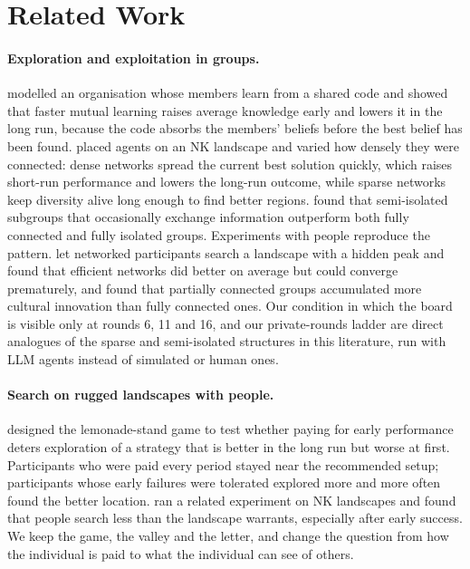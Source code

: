 \section{Related Work}\label{sec:related}

\paragraph{Exploration and exploitation in groups.}
\citet{march1991exploration} modelled an organisation whose members learn from a shared code and showed that
faster mutual learning raises average knowledge early and lowers it in the long run, because the code absorbs
the members' beliefs before the best belief has been found. \citet{lazer2007network} placed agents on an NK
landscape \citep{levinthal1997adaptation} and varied how densely they were connected: dense networks spread the
current best solution quickly, which raises short-run performance and lowers the long-run outcome, while
sparse networks keep diversity alive long enough to find better regions. \citet{fang2010balancing} found that
semi-isolated subgroups that occasionally exchange information outperform both fully connected and fully
isolated groups. Experiments with people reproduce the pattern. \citet{mason2012collaborative} let networked
participants search a landscape with a hidden peak and found that efficient networks did better on average
but could converge prematurely, and \citet{derex2016partial} found that partially connected groups accumulated
more cultural innovation than fully connected ones. Our condition in which the board is visible only at rounds 6, 11 and 16, and our private-rounds
ladder are direct analogues of the sparse and semi-isolated structures in this literature, run with LLM agents
instead of simulated or human ones.

\paragraph{Search on rugged landscapes with people.}
\citet{ederer2013pay} designed the lemonade-stand game to test whether paying for early performance deters
exploration of a strategy that is better in the long run but worse at first. Participants who were paid every
period stayed near the recommended setup; participants whose early failures were tolerated explored more and
more often found the better location. \citet{billinger2014search} ran a related experiment on NK landscapes
and found that people search less than the landscape warrants, especially after early success. We keep the
game, the valley and the letter, and change the question from how the individual is paid to what the
individual can see of others.

